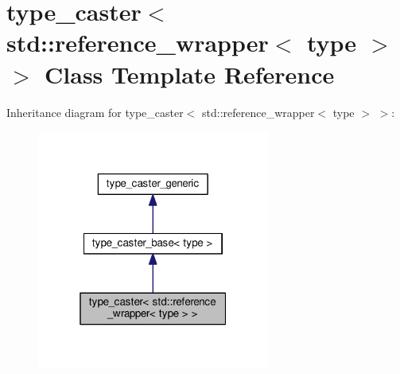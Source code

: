 \hypertarget{classtype__caster_3_01std_1_1reference__wrapper_3_01type_01_4_01_4}{}\section{type\+\_\+caster$<$ std\+:\+:reference\+\_\+wrapper$<$ type $>$ $>$ Class Template Reference}
\label{classtype__caster_3_01std_1_1reference__wrapper_3_01type_01_4_01_4}


Inheritance diagram for type\+\_\+caster$<$ std\+:\+:reference\+\_\+wrapper$<$ type $>$ $>$\+:
\nopagebreak
\begin{figure}[H]
\begin{center}
\leavevmode
\includegraphics[width=217pt]{classtype__caster_3_01std_1_1reference__wrapper_3_01type_01_4_01_4__inherit__graph}
\end{center}
\end{figure}


